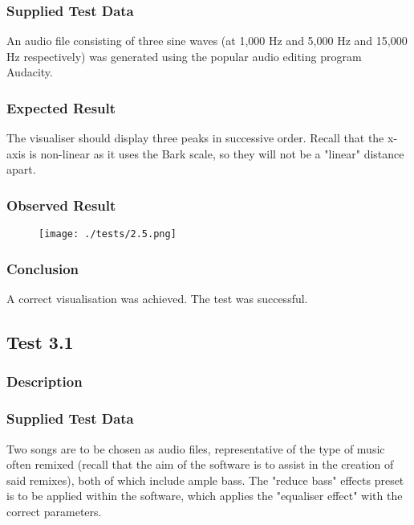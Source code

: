\subsubsection{Supplied Test Data}
An audio file consisting of three sine waves (at 1,000 Hz and 5,000 Hz and 15,000 Hz respectively) was generated using the popular audio editing program Audacity.

\subsubsection{Expected Result}
The visualiser should display three peaks in successive order. Recall that the x-axis is non-linear as it uses the Bark scale, so they will not be a "linear" distance apart.

\subsubsection{Observed Result}
\label{sec:evidence2.5}
\begin{figure}[H]
	\texttt{[image: ./tests/2.5.png]}
\end{figure}

\subsubsection{Conclusion}
A correct visualisation was achieved. The test was successful.


\pagebreak
\subsection{Test 3.1}
\subsubsection{Description}
\paragraph{}
{
	\centering
}

\subsubsection{Supplied Test Data}
Two songs are to be chosen as audio files, representative of the type of music often remixed (recall that the aim of the software is to assist in the creation of said remixes), both of which include ample bass. The "reduce bass" effects preset is to be applied within the software, which applies the "equaliser effect" with the correct parameters.

